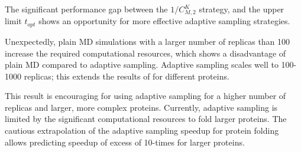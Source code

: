 The significant performance gap between the $1/C_{M,2}^K$ strategy, and the upper limit $t_{opt}$ shows an opportunity for more effective adaptive sampling strategies.

Unexpectedly, plain MD simulations with a larger number of replicas than 100 increase the required computational resources, which shows a disadvantage of plain MD compared to adaptive sampling. Adaptive sampling scales well to 100-1000 replicas; this extends the results of \cite{bowman2010enhanced} for different proteins.  

This result is encouraging for using adaptive sampling for a higher number of replicas and larger, more complex proteins. Currently, adaptive sampling is limited by the significant computational resources to fold larger proteins. The cautious extrapolation of the adaptive sampling speedup for protein folding allows predicting speedup of excess of 10-times for larger proteins.











